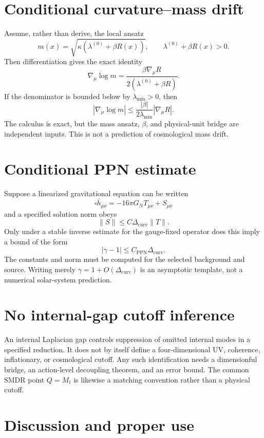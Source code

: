 \documentclass[11pt]{article}
\begin{document}
\section{Conditional curvature--mass drift}

Assume, rather than derive, the local ansatz
\[
m(x)=\sqrt{\kappa(\lambda^{(0)}+\beta R(x))},
\qquad \lambda^{(0)}+\beta R(x)>0.
\]
Then differentiation gives the exact identity
\[
\nabla_\mu\log m
=\frac{\beta\nabla_\mu R}{2(\lambda^{(0)}+\beta R)}.
\]
If the denominator is bounded below by $\lambda_{\min}>0$, then
\[
|\nabla_\mu\log m|
\leq\frac{|\beta|}{2\lambda_{\min}}|\nabla_\mu R|.
\]
The calculus is exact, but the mass ansatz, $\beta$, and physical-unit bridge
are independent inputs. This is not a prediction of cosmological mass drift.

\section{Conditional PPN estimate}

Suppose a linearized gravitational equation can be written
\[
\square\bar h_{\mu\nu}=-16\pi G_NT_{\mu\nu}+S_{\mu\nu}
\]
and a specified solution norm obeys
\[
\|S\|\leq C\Delta_{\mathrm{curv}}\|T\|.
\]
Only under a stable inverse estimate for the gauge-fixed operator does this
imply a bound of the form
\[
|\gamma-1|\leq C_{\mathrm{PPN}}\Delta_{\mathrm{curv}}.
\]
The constants and norm must be computed for the selected background and source.
Writing merely $\gamma=1+O(\Delta_{\mathrm{curv}})$ is an asymptotic template,
not a numerical solar-system prediction.

\section{No internal-gap cutoff inference}

An internal Laplacian gap controls suppression of omitted internal modes in a
specified reduction. It does not by itself define a four-dimensional UV,
coherence, inflationary, or cosmological cutoff. Any such identification needs
a dimensionful bridge, an action-level decoupling theorem, and an error bound.
The common SMDR point $Q=M_t$ is likewise a matching convention rather than a
physical cutoff.

\section{Discussion and proper use}
\end{document}
